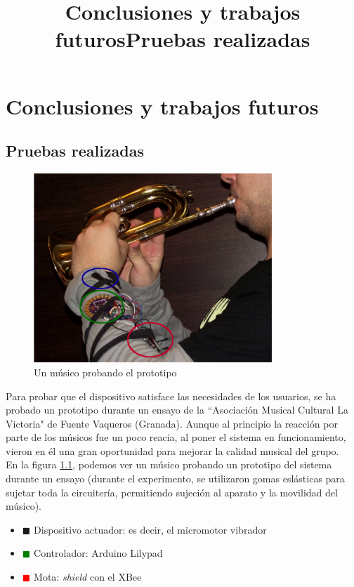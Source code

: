 \chapter{Conclusiones y trabajos futuros}
\title{Conclusiones y trabajos futuros}

\section{Pruebas realizadas}
\title{Pruebas realizadas}

\begin{figure}[htb]
\centering
\captionsetup{justification=centering}
\includegraphics[width=0.8\textwidth]{./imagenes/musicoprobando}
\caption{Un músico probando el prototipo} \label{fig:musicoprobando}
\end{figure}

Para probar que el dispositivo satisface las necesidades de los usuarios, se ha
probado un prototipo durante un ensayo de la ``Asociación Musical Cultural La Victoria"
de Fuente Vaqueros (Granada). Aunque al principio la reacción por parte de los músicos
fue un poco reacia, al poner el sistema en funcionamiento, vieron en él una gran
oportunidad para mejorar la calidad musical del grupo.\\

En la figura \ref{fig:musicoprobando}, podemos ver un músico probando un prototipo
del sistema durante un ensayo (durante el experimento, se utilizaron gomas eslásticas para sujetar toda
la circuitería, permitiendo sujeción al aparato y la movilidad del músico).
\begin{itemize}
  \item \textcolor{blueS}{$\blacksquare$} Dispositivo actuador: es decir,
  el micromotor vibrador
  \item \textcolor{green}{$\blacksquare$} Controlador: Arduino Lilypad
  \item \textcolor{red}{$\blacksquare$} Mota: \textit{shield} con el XBee
\end{itemize}


